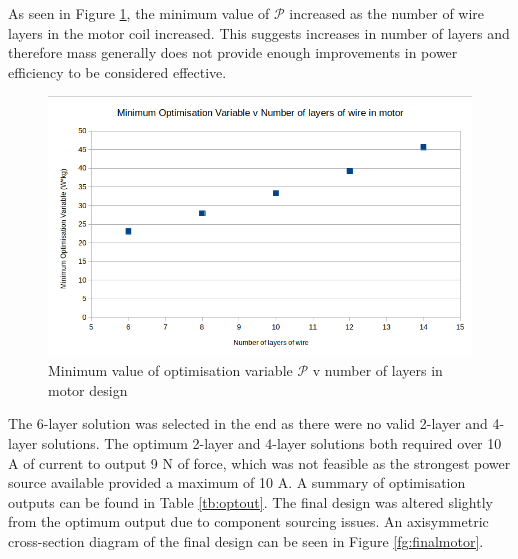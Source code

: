 \documentclass[a4paper,12pt]{article}
\begin{document}
As seen in Figure \ref{fg:optvariable}, the minimum value of $\mathcal{P}$ increased as the number of wire layers in the motor coil increased. This suggests increases in number of layers and therefore mass generally does not provide enough improvements in power efficiency to be considered effective.

\begin{figure}[h!]
    \centering
    \includegraphics[width=\textwidth]{[P]_v_layers.png}
    \caption{Minimum value of optimisation variable $\mathcal{P}$ v number of layers in motor design}
    \label{fg:optvariable}
\end{figure}

The 6-layer solution was selected in the end as there were no valid 2-layer and 4-layer solutions. The optimum 2-layer and 4-layer solutions both required over 10 A of current to output 9 N of force, which was not feasible as the strongest power source available provided a maximum of 10 A. A summary of optimisation outputs can be found in Table \ref{tb:optout}. The final design was altered slightly from the optimum output due to component sourcing issues. An axisymmetric cross-section diagram of the final design can be seen in Figure \ref{fg:finalmotor}.
\end{document}
